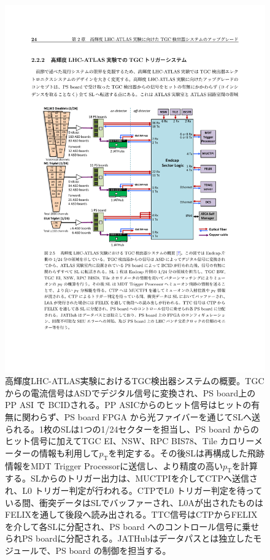 \begin{figure} 
\centering
\includegraphics[width=16cm]{fig/Intro/TGC_phase2tdaq.pdf}
\caption[高輝度LHC-ATLAS実験におけるTGC検出器システムの概要]{高輝度LHC-ATLAS実験におけるTGC検出器システムの概要\cite{tdr_phase2muon_2017017}。TGCからの電流信号はASDでデジタル信号に変換され、PS board上のPP ASI で BCIDされる。PP ASICからのヒット信号はヒットの有無に関わらず、PS board FPGA から光ファイバーを通じてSLへ送られる。1枚のSLは1つの1/24セクターを担当し、PS board からのヒット信号に加えてTGC EI、NSW、RPC BIS78、Tile カロリーメーターの情報も利用して$p_{\mathrm{T}}$を判定する。その後SLは再構成した飛跡情報をMDT Trigger Processorに送信し、より精度の高い$p_{\mathrm{T}}$を計算する。SLからのトリガー出力は、MUCTPIを介してCTPへ送信され、L0 トリガー判定が行われる。CTPでL0 トリガー判定を待っている間、衝突データはSLでバッファーされ、L0Aが出されたものはFELIXを通して後段へ読み出される。TTC信号はCTPからFELIXを介して各SLに分配され、PS board へのコントロール信号に乗せられPS boardに分配される。JATHubはデータパスとは独立したモジュールで、PS board の制御を担当する。}
\label{TGC_phase2tdaq}
\end{figure}

